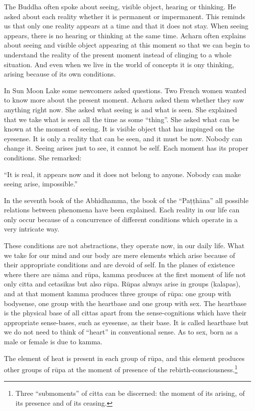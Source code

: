 \documentclass{book}
\begin{document}
The Buddha often spoke about seeing, visible
object, hearing or thinking. He asked about each reality whether it is
permanent or impermanent. This reminds us that only one reality appears
at a time and that it does not stay. When seeing appears, there is no
hearing or thinking at the same time. Acharn often explains about seeing
and visible object appearing at this moment so that we can begin to
understand the reality of the present moment instead of clinging to a
whole situation. And even when we live in the world of concepts it is
ony thinking, arising because of its own conditions. 

In Sun Moon Lake some newcomers asked
questions. Two French women wanted to know more about the present
moment. Acharn asked them whether they saw anything right now. She asked
what seeing is and what is seen. She explained that we take what is seen
all the time as some ``thing''. She asked what can be known at the
moment of seeing. It is visible object that has impinged on the
eyesense. It is only a reality that can be seen, and it must be now.
Nobody can change it. Seeing arises just to see, it cannot be self. Each
moment has its proper conditions. She remarked:

``It is real, it appears now and it does not
belong to anyone. Nobody can make seeing arise, impossible.''

In the seventh book of the Abhidhamma, the
book of the ``Paṭṭhāna''
all possible relations between
phenomena have been
explained. Each reality in our life can
only occur because of a concurrence of different conditions which
operate in a very intricate way. 

These conditions are not
abstractions, they operate now, in our daily life. What we take for our
mind and our body are mere elements which arise because of their
appropriate conditions and are devoid of self. In the planes
of existence where there are nāma and rūpa, kamma produces at the first
moment of life not only citta and cetasikas but also rūpa. Rūpas always
arise in groups (kalapas), and at that moment kamma produces three
groups of rūpa: one group with bodysense, one group with the heartbase
and one group with sex. The heartbase is the physical base of all cittas
apart from the sense-cognitions which have their appropriate
sense-bases, such as eyesense, as their base. It is called heartbase but
we do not need to think of ``heart'' in conventional sense. As to sex,
born as a male or female is due to kamma. 

The element of heat is present in each group
of rūpa, and this element produces other groups of rūpa at the moment of
presence of the rebirth-consciousness.\footnote{Three
``submoments'' of citta can be discerned: the moment of its arising, of
its presence and of its ceasing. }
\end{document}
